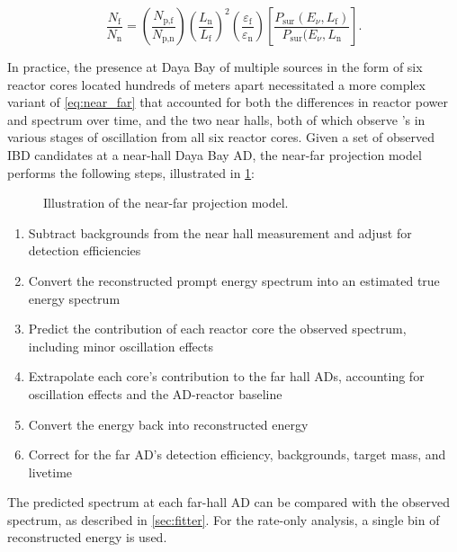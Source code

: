 \begin{equation}\label{eq:near_far}
    \frac{N_\text{f}}{N_\text{n}} = \left(\frac{N_\text{p,f}}{N_\text{p,n}}\right)
    \left(\frac{L_\text{n}}{L_\text{f}}\right)^2
    \left(\frac{\varepsilon_\text{f}}{\varepsilon_\text{n}}\right)
    \left[\frac{P_\text{sur}(E_\nu, L_\text{f})}{P_\text{sur}(E_\nu, L_\text{n}}\right].
\end{equation}

In practice, the presence at Daya Bay of multiple \nuebar{} sources
in the form of six reactor cores located hundreds of meters apart
necessitated a more complex variant of \cref{eq:near_far}
that accounted for both the differences in reactor power and spectrum over time,
and the two near halls, both of which observe \nuebar{}'s
in various stages of oscillation from all six reactor cores.
Given a set of observed IBD candidates at a near-hall Daya Bay AD,
the near-far projection model performs the following steps,
illustrated in \cref{fig:near_far_cartoon}:

\begin{figure}
    \caption{Illustration of the near-far projection model.}
    \label{fig:near_far_cartoon}
\end{figure}

\begin{enumerate}
    \item Subtract backgrounds from the near hall measurement
        and adjust for detection efficiencies
    \item Convert the reconstructed prompt energy spectrum
        into an estimated true \nuebar{} energy spectrum
    \item Predict the contribution of each reactor core
        the observed \nuebar{} spectrum,
        including minor oscillation effects
    \item Extrapolate each core's contribution to the far hall ADs,
        accounting for oscillation effects and the AD-reactor baseline
    \item Convert the \nuebar{} energy back into reconstructed energy
    \item Correct for the far AD's detection efficiency, backgrounds,
        target mass, and livetime
\end{enumerate}
The predicted spectrum at each far-hall AD can be compared
with the observed spectrum, as described in \cref{sec:fitter}.
For the rate-only analysis, a single bin of reconstructed energy is used.

